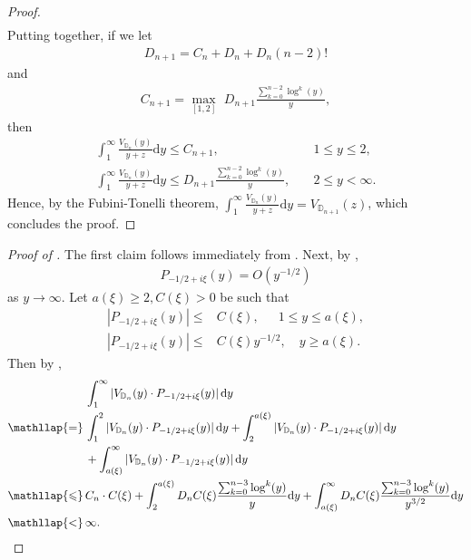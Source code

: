 \documentclass{amsart}
\newcommand{\DD}{\mathbb{D}}
\theoremstyle{definition}
\begin{document}
\begin{proof}
\begin{equation}
\begin{split}
\end{split}
\end{equation}
Putting  together, if we let
\begin{align*}
D_{n+1} = C_n+D_n+D_n(n-2)!
\end{align*}
and
\begin{align*}
C_{n+1} = \max_{[1,2]}\,\, D_{n+1} \frac{\sum_{k=0}^{n-2}\log^k(y)}{y},
\end{align*}
then 
\begin{equation}
\begin{split}
    \int_1^\infty \frac{V_{\DD_n}(y)}{y+z} \mathrm{d}y  \leqslant C_{n+1},& \quad1\leqslant y\leqslant 2,
    \\
    \int_1^\infty \frac{V_{\DD_n}(y)}{y+z} \mathrm{d}y \leqslant D_{n+1} \frac{\sum_{k=0}^{n-2}\log^k(y)}{y},& \quad 2\leqslant y < \infty.
\end{split}
\end{equation}
Hence, by the Fubini-Tonelli theorem, $\int_1^\infty \frac{V_{\DD_n}(y)}{y+z} \mathrm{d}y = V_{\DD_{n+1}}(z)$, which concludes the proof.
\end{proof}

\begin{proof}[Proof of ] The first claim follows immediately from . Next, 
by \cite[Equation~1.9.7]{MR2254107}, 
\begin{align}
    P_{-1/2+i\xi}(y) = O(y^{-1/2})
\end{align}
as $y \to \infty$. Let $a(\xi)\geqslant 2,C(\xi)>0$ be such that
\begin{equation*}
\begin{split}
|P_{-1/2+i\xi}(y)|\leqslant& C(\xi), \quad\,\,\, 1\leqslant y\leqslant a(\xi), \\
|P_{-1/2+i\xi}(y)|\leqslant& C(\xi)y^{-1/2}, \quad y\geqslant a(\xi).
\end{split}
\end{equation*}
Then by ,
\[
\begin{aligned}
&\int_1^\infty |V_{\DD_n}(y)\cdot P_{-1/2+i\xi}(y)|\,\mathrm{d}y \\
\smash{\mathllap{=}}\, &\int_1^2 |V_{\DD_n}(y)\cdot P_{-1/2+i\xi}(y)|\,\mathrm{d}y+\int_2^{a(\xi)} |V_{\DD_n}(y)\cdot P_{-1/2+i\xi}(y)|\,\mathrm{d}y\\&+\int_{a(\xi)}^{\infty} |V_{\DD_n}(y)\cdot P_{-1/2+i\xi}(y)|\,\mathrm{d}y\\
\smash{\mathllap{\leqslant}}\, &  C_n\cdot C(\xi) + \int_2^{a(\xi)} D_n C(\xi)\frac{\sum_{k=0}^{n-3}\log^k(y)}{y}\mathrm{d}y +\int_{a(\xi)}^\infty D_n C(\xi)\frac{\sum_{k=0}^{n-3}\log^k(y)}{y^{3/2}}\mathrm{d}y \\
\smash{\mathllap{<}}\, & \infty.
\end{aligned}
\]


\end{proof}





\end{document}

